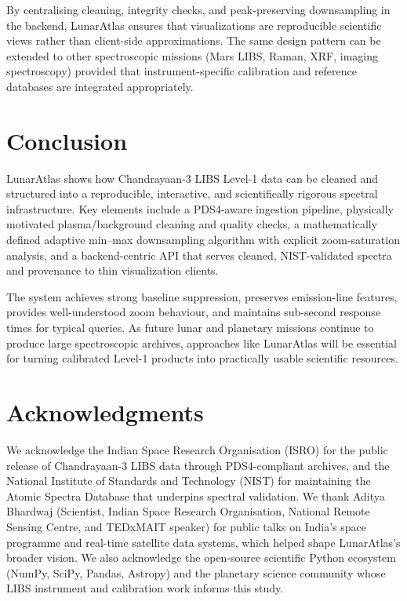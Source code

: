 \documentclass[12pt,a4paper]{article}
\begin{document}
By centralising cleaning, integrity checks, and peak-preserving downsampling in the backend, LunarAtlas ensures that visualizations are reproducible scientific views rather than client-side approximations. The same design pattern can be extended to other spectroscopic missions (Mars LIBS, Raman, XRF, imaging spectroscopy) provided that instrument-specific calibration and reference databases are integrated appropriately.

\section{Conclusion}
\label{sec:conclusion}

LunarAtlas shows how Chandrayaan-3 LIBS Level-1 data can be cleaned and structured into a reproducible, interactive, and scientifically rigorous spectral infrastructure. Key elements include a PDS4-aware ingestion pipeline, physically motivated plasma/background cleaning and quality checks, a mathematically defined adaptive min--max downsampling algorithm with explicit zoom-saturation analysis, and a backend-centric API that serves cleaned, NIST-validated spectra and provenance to thin visualization clients.

The system achieves strong baseline suppression, preserves emission-line features, provides well-understood zoom behaviour, and maintains sub-second response times for typical queries. As future lunar and planetary missions continue to produce large spectroscopic archives, approaches like LunarAtlas will be essential for turning calibrated Level-1 products into practically usable scientific resources.

\section*{Acknowledgments}

We acknowledge the Indian Space Research Organisation (ISRO) for the public release of Chandrayaan-3 LIBS data through PDS4-compliant archives, and the National Institute of Standards and Technology (NIST) for maintaining the Atomic Spectra Database that underpins spectral validation.\cite{ReaderNIST} We thank Aditya Bhardwaj (Scientist, Indian Space Research Organisation, National Remote Sensing Centre, and TEDxMAIT speaker) for public talks on India's space programme and real-time satellite data systems, which helped shape LunarAtlas's broader vision. We also acknowledge the open-source scientific Python ecosystem (NumPy, SciPy, Pandas, Astropy) and the planetary science community whose LIBS instrument and calibration work informs this study.
\end{document}
